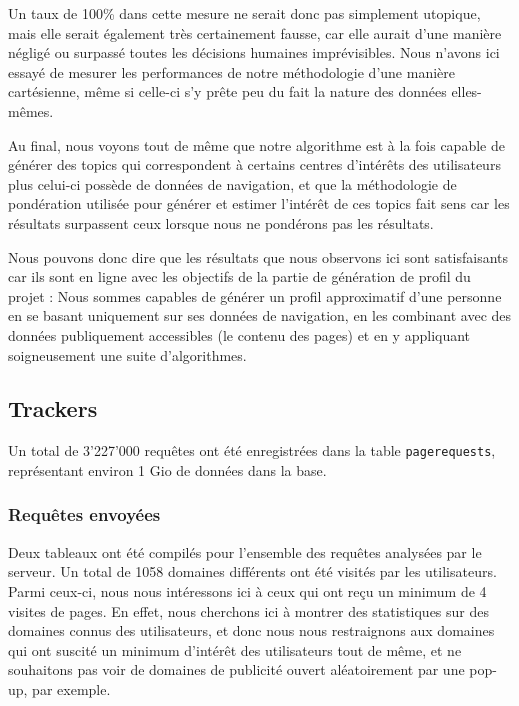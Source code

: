 			Un taux de 100\% dans cette mesure ne serait donc pas simplement utopique, mais elle serait également très certainement fausse, car elle aurait d'une manière négligé ou surpassé toutes les décisions humaines imprévisibles. Nous n'avons ici essayé de mesurer les performances de notre méthodologie d'une manière cartésienne, même si celle-ci s'y prête peu du fait la nature des données elles-mêmes.

			Au final, nous voyons tout de même que notre algorithme est à la fois capable de générer des topics qui correspondent à certains centres d'intérêts des utilisateurs plus celui-ci possède de données de navigation, et que la méthodologie de pondération utilisée pour générer et estimer l'intérêt de ces topics fait sens car les résultats surpassent ceux lorsque nous ne pondérons pas les résultats.

			Nous pouvons donc dire que les résultats que nous observons ici sont satisfaisants car ils sont en ligne avec les objectifs de la partie de génération de profil du projet : Nous sommes capables de générer un profil approximatif d'une personne en se basant uniquement sur ses données de navigation, en les combinant avec des données publiquement accessibles (le contenu des pages) et en y appliquant soigneusement une suite d'algorithmes.

%
%
%
%
%
%


\clearpage

	\subsection{Trackers}

		Un total de 3'227'000 requêtes ont été enregistrées dans la table \texttt{pagerequests}, représentant environ 1 Gio de données dans la base. 

		\subsubsection{Requêtes envoyées}

			Deux tableaux ont été compilés pour l'ensemble des requêtes analysées par le serveur. Un total de 1058 domaines différents ont été visités par les utilisateurs. Parmi ceux-ci, nous nous intéressons ici à ceux qui ont reçu un minimum de 4 visites de pages. En effet, nous cherchons ici à montrer des statistiques sur des domaines connus des utilisateurs, et donc nous nous restraignons aux domaines qui ont suscité un minimum d'intérêt des utilisateurs tout de même, et ne souhaitons pas voir de domaines de publicité ouvert aléatoirement par une pop-up, par exemple.

